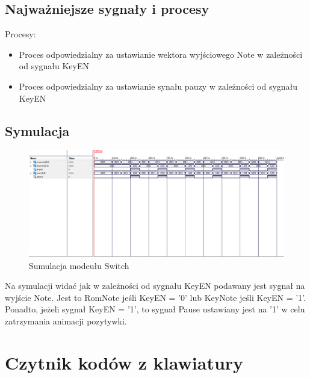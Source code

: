 \documentclass[a4paper]{report}
\begin{document}
		\subsection{Najważniejsze sygnały i procesy}
			{\Large Procesy:}
				\begin{itemize}
					\item Proces odpowiedzialny za ustawianie wektora wyjściowego Note w zależności od sygnału KeyEN\\
						
					\item Proces odpowiedzialny za ustawianie synału pauzy w zależności od sygnału KeyEN\\
						
				\end{itemize}
	
		\begin{landscape}
			\subsection{Symulacja}
				\begin{figure}[h!]
					\centering
					\includegraphics[width=1.6\textwidth]{switch_symulacja2.png}
					\caption{Sumulacja modeułu Switch}
				\end{figure}
			\justify
            Na symulacji widać jak w zależności od sygnału KeyEN podawany jest sygnał na wyjście Note. Jest to RomNote jeśli KeyEN = '0' lub KeyNote jeśli KeyEN = '1'.
            Ponadto, jeżeli sygnał KeyEN = '1', to sygnał Pause ustawiany jest na '1' w celu zatrzymania animacji pozytywki.

		\end{landscape}
	\section{Czytnik kodów z klawiatury}
\end{document}
